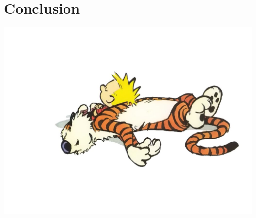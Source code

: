 \documentclass[12pt,a4paper]{report}
\begin{document}
\chapter{Conclusion}


\begin{center}
\includegraphics[scale =0.5]{conclu.jpg}
\end{center}
\end{document}
